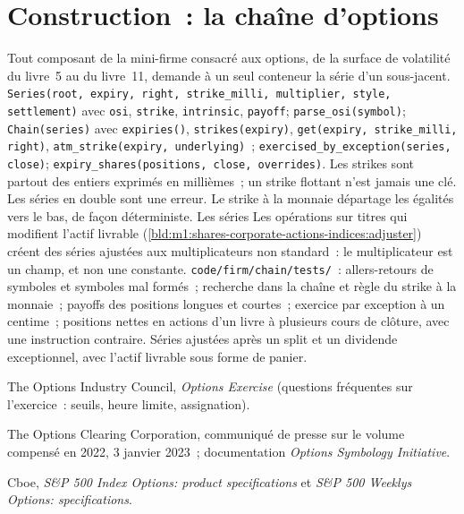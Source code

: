 \section{Construction~: la chaîne d'options}\label{bld:m1:option-contracts-and-exchanges:chain}

\begin{build}
 Tout composant de la mini-firme consacré aux options, de la surface de
volatilité du livre~5 au  du livre~11, demande
à un seul conteneur la série d'un sous-jacent.  \texttt{Series(root, expiry, right, strike\_milli,
multiplier, style, settlement)} avec \texttt{osi}, \texttt{strike},
\texttt{intrinsic}, \texttt{payoff}; \texttt{parse\_osi(symbol)};
\texttt{Chain(series)} avec \texttt{expiries()}, \texttt{strikes(expiry)}, \texttt{get(expiry, strike\_milli, right)}, \texttt{atm\_strike(expiry,
underlying)}~; \texttt{exercised\_by\_exception(series, close)};
\texttt{expiry\_shares(positions, close, overrides)}.
 Les strikes sont partout des entiers exprimés en millièmes~; un strike
flottant n'est jamais une clé. Les séries en double sont une erreur. Le strike à la
monnaie départage les égalités vers le bas, de façon déterministe. Les séries 
Les opérations sur titres qui modifient l'actif livrable
(\cref{bld:m1:shares-corporate-actions-indices:adjuster}) créent des séries ajustées
aux multiplicateurs non standard~: le multiplicateur est un champ, et non une
constante.
 \texttt{code/firm/chain/tests/}~: allers-retours de symboles
et symboles mal formés~; recherche dans la chaîne et règle du strike à la monnaie~; payoffs
des positions longues et courtes~; exercice par exception à un centime~; positions nettes
en actions d'un livre à plusieurs cours de clôture, avec une instruction contraire.
 Séries ajustées après un split et un dividende exceptionnel, avec
l'actif livrable sous forme de panier.
\end{build}

\begin{omsources}
\item The Options Industry Council, \emph{Options Exercise} (questions fréquentes sur
l'exercice~: seuils, heure limite, assignation).
\item The Options Clearing Corporation, communiqué de presse sur le volume compensé
en 2022, 3 janvier 2023~; documentation \emph{Options Symbology Initiative}.
\item Cboe, \emph{S\&P 500 Index Options: product specifications} et
\emph{S\&P 500 Weeklys Options: specifications}.
\end{omsources}


